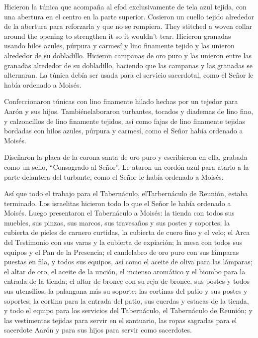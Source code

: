  Hicieron la túnica que acompaña al efod exclusivamente de
tela azul tejida,  con una abertura en el centro en la
parte superior. Cosieron un cuello tejido alrededor de la abertura para
reforzarla y que no se rompiera. They stitched a woven collar around the
opening to strengthen it so it wouldn't tear.  Hicieron
granadas usando hilos azules, púrpura y carmesí y lino finamente tejido
y las unieron alrededor de su dobladillo.  Hicieron
campanas de oro puro y las unieron entre las granadas alrededor de su
dobladillo,  haciendo que las campanas y las granadas se
alternaran. La túnica debía ser usada para el servicio sacerdotal, como
el Señor le había ordenado a Moisés.

 Confeccionaron túnicas con lino finamente hilado hechas
por un tejedor para Aarón y sus hijos.  Tambiénelaboraron
turbantes, tocados y diademas de lino fino, y calzoncillos de lino
finamente tejidos,  así como fajas de lino finamente
tejidas bordadas con hilos azules, púrpura y carmesí, como el Señor
había ordenado a Moisés.

 Diseñaron la placa de la corona santa de oro puro y
escribieron en ella, grabada como un sello, ``Consagrado al Señor''.
 Le ataron un cordón azul para atarlo a la parte delantera
del turbante, como el Señor le había ordenado a Moisés.

 Así que todo el trabajo para el Tabernáculo,
elTarbernáculo de Reunión, estaba terminado. Los israelitas hicieron
todo lo que el Señor le había ordenado a Moisés.  Luego
presentaron el Tabernáculo a Moisés: la tienda con todos sus muebles,
sus pinzas, sus marcos, sus travesaños y sus postes y soportes;
 la cubierta de pieles de carnero curtidas, la cubierta de
cuero fino y el velo;  el Arca del Testimonio con sus varas
y la cubierta de expiación;  la mesa con todos sus equipos
y el Pan de la Presencia;  el candelabro de oro puro con
sus lámparas puestas en fila, y todos sus equipos, así como el aceite de
oliva para las lámparas;  el altar de oro, el aceite de la
unción, el incienso aromático y el biombo para la entrada de la tienda;
 el altar de bronce con su reja de bronce, sus postes y
todos sus utensilios; la palangana más su soporte;  las
cortinas del patio y sus postes y soportes; la cortina para la entrada
del patio, sus cuerdas y estacas de la tienda, y todo el equipo para los
servicios del Tabernáculo, el Tabernáculo de Reunión;  y
las vestimentas tejidas para servir en el santuario, las ropas sagradas
para el sacerdote Aarón y para sus hijos para servir como sacerdotes.

